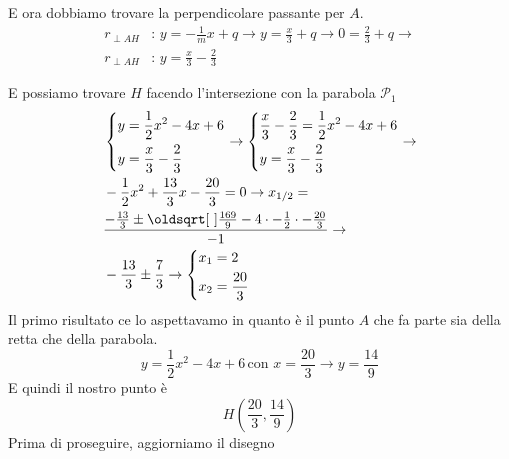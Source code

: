 E ora dobbiamo trovare la perpendicolare passante per $A$.
\begin{align*}
r_{\perp AH}&:\,y=-\frac{1}{m}x+q \rightarrow y=\frac{x}{3}+q\rightarrow 0=\frac{2}{3}+q \rightarrow\\
r_{\perp AH}&:\,y=\frac{x}{3}-\frac{2}{3}
\end{align*}

E possiamo trovare $H$ facendo l'intersezione con la parabola $\mathscr{P}_1$
\begin{align*}
&\begin{dcases}
y = \frac{1}{2}x^2-4x+6\\
y=\frac{x}{3}-\frac{2}{3}
\end{dcases}\rightarrow
\begin{dcases}
\frac{x}{3}-\frac{2}{3} = \frac{1}{2}x^2-4x+6\\
y=\frac{x}{3}-\frac{2}{3}
\end{dcases}\rightarrow\\
&-\frac{1}{2}x^2+\frac{13}{3}x-\frac{20}{3}=0 \rightarrow 
x_{1/2} = \\
&\frac{-\frac{13}{3}\pm\sqrt{\frac{169}{9}-4\cdot-\frac{1}{2}\cdot-\frac{20}{3}}}{-1} 
\rightarrow\\ &-\frac{13}{3}\pm\frac{7}{3}\rightarrow\begin{dcases}
x_1 = 2\\
x_2 = \frac{20}{3}
\end{dcases}
\end{align*}
Il primo risultato ce lo aspettavamo in quanto è il punto $A$ che fa parte sia della retta che della
parabola.
\begin{equation*}
y = \frac{1}{2}x^2-4x+6 \, \text{con } x = \frac{20}{3} \rightarrow y = \frac{14}{9}
\end{equation*}
E quindi il nostro punto è
\begin{equation*}
H\left(\frac{20}{3},\frac{14}{9}\right)
\end{equation*}
Prima di proseguire, aggiorniamo il disegno
